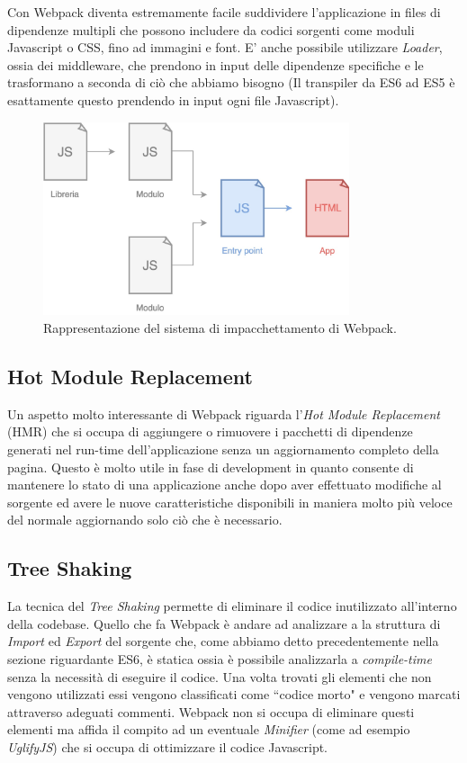 Con Webpack diventa estremamente facile suddividere l'applicazione in files di dipendenze multipli che possono includere da codici sorgenti come moduli Javascript o CSS, fino ad immagini e font.
E' anche possibile utilizzare \textit{Loader}, ossia dei middleware, che prendono in input delle dipendenze specifiche e le trasformano a seconda di ciò che abbiamo bisogno (Il transpiler da ES6 ad ES5 è esattamente questo prendendo in input ogni file Javascript).

\begin{figure}[h]
\centering
\includegraphics[width=9cm]{./images/webpackWorkflow}
\caption{Rappresentazione del sistema di impacchettamento di Webpack.}
\end{figure}

\subsection{Hot Module Replacement}
Un aspetto molto interessante di Webpack riguarda l'\textit{Hot Module Replacement} (HMR) che si occupa di aggiungere o rimuovere i pacchetti di dipendenze generati nel run-time dell'applicazione senza un aggiornamento completo della pagina. Questo è molto utile in fase di development in quanto consente di mantenere lo stato di una applicazione anche dopo aver effettuato modifiche al sorgente ed avere le nuove caratteristiche disponibili in maniera molto più veloce del normale aggiornando solo ciò che è necessario. 



\subsection{Tree Shaking}
La tecnica del \textit{Tree Shaking} permette di eliminare il codice inutilizzato all'interno della codebase. Quello che fa Webpack è andare ad analizzare a la struttura di \textit{Import} ed \textit{Export} del sorgente che, come abbiamo detto precedentemente nella sezione riguardante ES6, è statica ossia è possibile analizzarla a \textit{compile-time} senza la necessità di eseguire il codice. Una volta trovati gli elementi che non vengono utilizzati essi vengono classificati come “codice morto" e vengono marcati attraverso adeguati commenti. Webpack non si occupa di eliminare questi elementi ma affida il compito ad un eventuale \textit{Minifier} (come ad esempio \textit{UglifyJS}) che si occupa di ottimizzare il codice Javascript.

